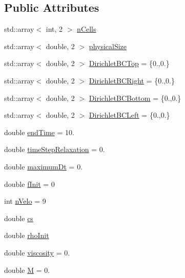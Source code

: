 \subsection*{Public Attributes}
\begin{DoxyCompactItemize}
\item 
std\+::array$<$ int, 2 $>$ \mbox{\hyperlink{structSettings_a43a0d2ee903496bfb86693a43a891a69}{n\+Cells}}
\item 
std\+::array$<$ double, 2 $>$ \mbox{\hyperlink{structSettings_a372a1549c306b12ca7bb0ed84f8a4cef}{physical\+Size}}
\item 
std\+::array$<$ double, 2 $>$ \mbox{\hyperlink{structSettings_a3bc8ca94bfe51363a76e9f974b3863f4}{Dirichlet\+B\+C\+Top}} = \{0.,0.\}
\item 
std\+::array$<$ double, 2 $>$ \mbox{\hyperlink{structSettings_af4eaa0cd4601394a6d5c6cbc938c2714}{Dirichlet\+B\+C\+Right}} = \{0.,0.\}
\item 
std\+::array$<$ double, 2 $>$ \mbox{\hyperlink{structSettings_aa04d7a368baf246849f0c65882900177}{Dirichlet\+B\+C\+Bottom}} = \{0.,0.\}
\item 
std\+::array$<$ double, 2 $>$ \mbox{\hyperlink{structSettings_aaf2f9565c1f20214e240af235ecbc9ef}{Dirichlet\+B\+C\+Left}} = \{0.,0.\}
\item 
double \mbox{\hyperlink{structSettings_a73cd9110793ede99e9ebe409e5e115fd}{end\+Time}} = 10.
\item 
double \mbox{\hyperlink{structSettings_ab186bb6f0f6ce1f234e5ab5a221c838d}{time\+Step\+Relaxation}} = 0.
\item 
double \mbox{\hyperlink{structSettings_a988b93fdeb6c91932043b3f746b45e86}{maximum\+Dt}} = 0.
\item 
double \mbox{\hyperlink{structSettings_a36c93b408af73ebd4a00509a8d5c3b54}{f\+Init}} = 0
\item 
int \mbox{\hyperlink{structSettings_aefbc364c73123eacd4904e6429729013}{n\+Velo}} = 9
\item 
double \mbox{\hyperlink{structSettings_ada065d4ba81dd3d37f1c91267b631f30}{cs}}
\item 
double \mbox{\hyperlink{structSettings_aaf6b6f469c3ba50604e75845f1aa3b2a}{rho\+Init}}
\item 
double \mbox{\hyperlink{structSettings_a96d99822c1bf7f6b025c93546c1c2a3a}{viscosity}} = 0.
\item 
double \mbox{\hyperlink{structSettings_a36ab17aa9afc92ec22ac23f453572e57}{M}} = 0.
\item 

\end{DoxyCompactItemize}
